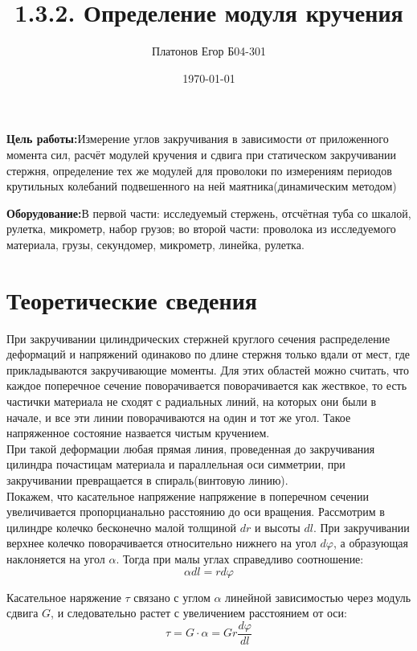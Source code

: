 \documentclass[a4paper, 12pt]{article}
\title{1.3.2. Определение модуля кручения}
\author{Платонов Егор Б04-301}
\date{\today}
\begin{document}
	\maketitle
		\textbf{Цель работы:}Измерение углов закручивания в зависимости от приложенного момента сил, расчёт модулей кручения и сдвига при статическом закручивании стержня, определение тех же модулей для проволоки по измерениям периодов крутильных колебаний подвешенного на ней маятника(динамическим методом)
  
		\textbf{Оборудование:}В первой части: исследуемый стержень, отсчётная туба со шкалой, рулетка, микрометр, набор грузов;
		во второй части: проволока из исследуемого материала, грузы, секундомер, микрометр, линейка, рулетка.
	\section*{Теоретические сведения}
		При закручивании цилиндрических стержней круглого сечения распределение деформаций
 и напряжений одинаково по длине стержня только вдали от мест, где прикладываются закручивающие моменты.
Для этих областей можно считать, что каждое поперечное сечение поворачивается поворачивается как жествкое,
то есть частички материала не сходят с радиальных линий, на которых они были в начале, и все
эти линии поворачиваются на один и тот же угол. Такое напряженное состояние назвается чистым кручением.\\

При такой деформации любая прямая линия, проведенная до закручивания цилиндра почастицам материала и параллельная оси симметрии,
при закручивании превращается в спираль(винтовую линию). \\

Покажем, что касательное напряжение напряжение в поперечном сечении увеличивается пропорцианально
 расстоянию до оси вращения.
Рассмотрим в цилиндре колечко бесконечно малой толщиной $dr$ и высоты $dl$. При закручивании верхнее колечко поворачивается относительно 
нижнего на угол $d\varphi$, а образующая наклоняется на угол $\alpha$. Тогда при малы углах справедливо соотношение:
\begin{equation}
    \alpha dl= r d\varphi 
\end{equation}

Касательное наряжение $\tau $ связано с углом $\alpha$ линейной зависимостью через модуль сдвига $G$,
 и следовательно растет с увеличением расстоянием от оси:
\begin{equation}
    \tau = G\cdot \alpha =Gr\frac{d\varphi}{dl} 
\end{equation}
\end{document}
